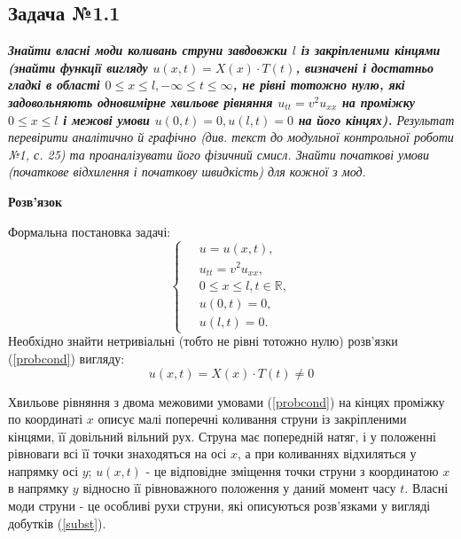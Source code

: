 \subsection*{Задача №1.1}

\textit{\textbf{Знайти власні моди коливань струни завдовжки $l$ із закріпленими кінцями (знайти функції вигляду $u(x,t) = X(x) \cdot T(t)$, визначені і достатньо гладкі в області $0 \leq x \leq l, -\infty \leq t \leq \infty$, не рівні тотожно нулю, які задовольняють одновимірне хвильове рівняння $u_{tt} = v^2 u_{xx}$ на проміжку $0 \leq x \leq l$ і межові умови $u(0,t) = 0, u(l,t) = 0$ на його кінцях).} Результат перевірити аналітично й графічно (див. текст до модульної контрольної роботи №1, с. 25) та проаналізувати його фізичний смисл. Знайти початкові умови (початкове відхилення і початкову швидкість) для кожної з мод.}

\begin{center}
    \large{\textbf{Розв'язок}}
\end{center}

\noindent Формальна постановка задачі:
\begin{equation} \label{probcond}
    \left\{ \begin{aligned} %
        \;&u = u(x,t), \\  &u_{tt} = v^2 u_{xx}, \\ &0 \leq x \leq l, t \in \mathbb{R}, \\  &u(0,t) = 0, \\ &u(l,t) = 0. 
    \end{aligned} \right.
\end{equation}
Необхідно знайти нетривіальні (тобто не рівні тотожно нулю) розв'язки (\ref{probcond}) вигляду:
\begin{equation} \label{subst}
    u(x,t) = X(x) \cdot T(t) \neq 0 
\end{equation}

Хвильове рівняння з двома межовими умовами (\ref{probcond}) на кінцях проміжку по координаті $x$ описує малі поперечні коливання струни із закріпленими кінцями, її довільний вільний рух. Струна має попередній натяг, і у положенні рівноваги  всі її точки знаходяться на осі $x$, а при коливаннях відхиляться у напрямку осі $y$; $u(x,t)$ - це відповідне зміщення точки струни з координатою $x$ в напрямку $y$ відносно її рівноважного положення у даний момент часу $t$. Власні моди струни - це особливі рухи струни, які описуються розв'язками у вигляді добутків (\ref{subst}). 

